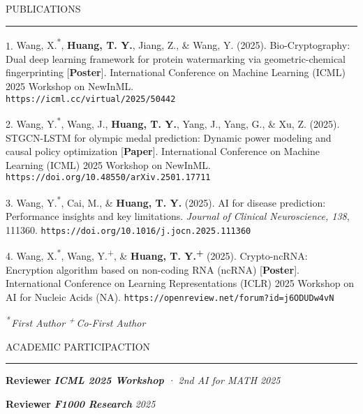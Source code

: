\documentclass{resume} %
\renewenvironment{rSection}[1]{
\sectionskip
\textcolor{TsinghuaPurple}{\MakeUppercase{#1}}
\sectionlineskip
\hrule
\begin{list}{}{
\setlength{\leftmargin}{0em}
}
\item[]
}{
\end{list}
}
\begin{document}
\begin{rSection}{Publications}        

1. {Wang, X.\textsuperscript{*}, \textbf{Huang, T. Y.}, Jiang, Z., \& Wang, Y. (2025). Bio-Cryptography: Dual deep learning framework for protein watermarking via geometric-chemical fingerprinting [\textbf{Poster}]. International Conference on Machine Learning (ICML) 2025 Workshop on NewInML. \\\texttt{https://icml.cc/virtual/2025/50442}} 

2. {Wang, Y.\textsuperscript{*}, Wang, J., \textbf{Huang, T. Y.}, Yang, J., Yang, G., \& Xu, Z. (2025). STGCN-LSTM for olympic medal prediction: Dynamic power modeling and causal policy optimization [\textbf{Paper}]. International Conference on Machine Learning (ICML) 2025 Workshop on NewInML. \\
\texttt{https://doi.org/10.48550/arXiv.2501.17711}} 

3. {Wang, Y.\textsuperscript{*}, Cai, M., \& \textbf{Huang, T. Y.} (2025). AI for disease prediction: Performance insights and key limitations. \textit{Journal of Clinical Neuroscience, 138}, 111360. \texttt{https://doi.org/10.1016/j.jocn.2025.111360}} 

4. {Wang, X.\textsuperscript{*}, Wang, Y.\textsuperscript{+}, \& \textbf{Huang, T. Y.\textsuperscript{+}} (2025). Crypto-ncRNA: Encryption algorithm based on non-coding RNA (ncRNA) [\textbf{Poster}]. International Conference on Learning Representations (ICLR) 2025 Workshop on AI for Nucleic Acids (NA). \texttt{https://openreview.net/forum?id=j6ODUDw4vN}} 

\textit{\footnotesize \textsuperscript{*}\,First Author \quad \textsuperscript{+}\,Co-First Author}
\end{rSection}

\begin{rSection}{ACADEMIC PARTICIPACTION}\itemsep -3pt

{\bf Reviewer} \quad \textit{\textbf{ICML 2025 Workshop} · 2nd AI for MATH} \hfill \textit{2025}

{\bf Reviewer} \quad \textit{\textbf{F1000 Research}} \hfill \textit{2025}
\end{rSection}
\end{document}
